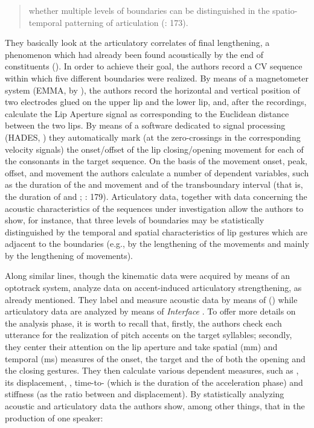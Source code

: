 \documentclass[output=paper]{langsci/langscibook}
\begin{document}
\begin{quote}
whether multiple levels of  boundaries can be distinguished in the spatio-temporal patterning of articulation (\citealt{Byrd1998}: 173).
\end{quote}

They basically look at the articulatory correlates of final lengthening, a phenomenon which had already been found acoustically by the end of  constituents (\citealt{Oller1973,Wightman1992}). In order to achieve their goal, the authors record a CV sequence within which five different  boundaries were realized. By means of a magnetometer system (EMMA, by \citealt{Perkell1992}), the authors record the horizontal and vertical position of two electrodes glued on the upper lip and the lower lip, and, after the recordings, calculate the Lip Aperture signal as corresponding to the Euclidean distance between the two lips. By means of a software dedicated to signal processing (HADES, \citealt{Rubin1995}) they automatically mark (at the zero-crossings in the corresponding velocity signals) the onset\slash offset of the lip closing\slash opening movement for each of the consonants in the target sequence. On the basis of the movement onset, peak, offset, and movement  the authors calculate a number of dependent variables, such as the duration of the  and  movement and of the transboundary interval (that is, the duration of  and ; \citealt{Byrd1998}: 179). Articulatory data, together with data concerning the acoustic characteristics of the sequences under investigation allow the authors to show, for instance, that three levels of  boundaries may be statistically distinguished by the temporal and spatial characteristics of lip gestures which are adjacent to the boundaries (e.g., by the lengthening of the  movements and mainly by the lengthening of  movements). 

Along similar lines, though the kinematic data were acquired by means of an optotrack system, \citet{Avesani2007,Avesani2009} analyze data on accent-induced articulatory strengthening, as already mentioned. They label and measure acoustic data by means of  (\citealt{Boersma.praat}) while articulatory data are analyzed by means of \textit{Interface} \citep{Tisato2005}. To offer more details on the analysis phase, it is worth to recall that, firstly, the authors check each utterance for the realization of pitch accents on the target syllables; secondly, they center their attention on the lip aperture and take spatial (mm) and temporal (ms) measures of the onset, the target and the  of both the opening and the closing gestures. They then calculate various dependent measures, such as , its displacement, , time-to- (which is the duration of the acceleration phase) and  stiffness (as the ratio between  and displacement). By statistically analyzing acoustic and articulatory data the authors show, among other things, that in the production of one speaker:
\end{document}
